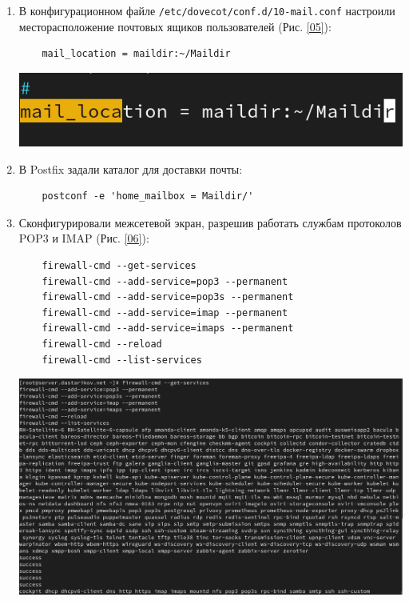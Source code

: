 \begin{enumerate}
\item В конфигурационном файле \texttt{/etc/dovecot/conf.d/10-mail.conf} настроили месторасположение почтовых ящиков пользователей (Рис. \ref{05}):
  \begin{verbatim}
    mail_location = maildir:~/Maildir
  \end{verbatim}
\begin{center}
    \centering
    \includegraphics[width=\textwidth]{../images/image05.png}
    \label{05}
\end{center}

\item В Postfix задали каталог для доставки почты:
  \begin{verbatim}
    postconf -e 'home_mailbox = Maildir/'
  \end{verbatim}
\item Сконфигурировали межсетевой экран, разрешив работать службам протоколов POP3 и IMAP (Рис. \ref{06}):
  \begin{verbatim}
    firewall-cmd --get-services
    firewall-cmd --add-service=pop3 --permanent
    firewall-cmd --add-service=pop3s --permanent
    firewall-cmd --add-service=imap --permanent
    firewall-cmd --add-service=imaps --permanent
    firewall-cmd --reload
    firewall-cmd --list-services
  \end{verbatim}
\begin{center}
    \centering
    \includegraphics[width=\textwidth]{../images/image06.png}
    \label{06}
\end{center}


\end{enumerate}
